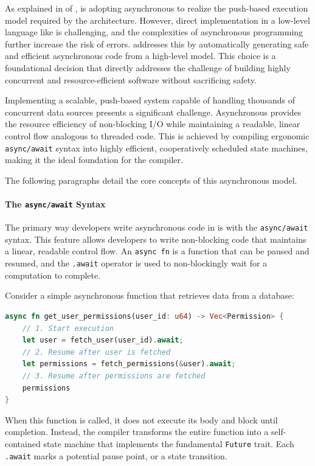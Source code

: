As explained in  of , \ampere is adopting asynchronous \Rust to realize the
push-based execution model required by the \sdv architecture. However, direct implementation in a
low-level language like \Rust is challenging, and the complexities of asynchronous programming
further increase the risk of errors. \GRust addresses this by automatically generating safe and
efficient asynchronous \Rust code from a high-level model. This choice is a foundational decision
that directly addresses the challenge of building highly concurrent and resource-efficient software
without sacrificing safety.

Implementing a scalable, push-based system capable of handling thousands of concurrent data sources
presents a significant challenge. Asynchronous \Rust provides the resource efficiency of
non-blocking I/O while maintaining a readable, linear control flow analogous to threaded code. This
is achieved by compiling ergonomic \texttt{async/await} syntax into highly efficient, cooperatively
scheduled state machines, making it the ideal foundation for the \GRust compiler.

The following paragraphs detail the core concepts of this asynchronous model.

\paragraph{The \texttt{async/await} Syntax}
The primary way developers write asynchronous code in \Rust is with the \texttt{async/await}
syntax. This feature allows developers to write non-blocking code that maintains a linear,
readable control flow. An \texttt{async fn} is a function that can be paused and resumed,
and the \texttt{.await} operator is used to non-blockingly wait for a computation to
complete.

Consider a simple asynchronous function that retrieves data from a database:
\begin{lstlisting}[language=Rust]
async fn get_user_permissions(user_id: u64) -> Vec<Permission> {
    // 1. Start execution
    let user = fetch_user(user_id).await;
    // 2. Resume after user is fetched
    let permissions = fetch_permissions(&user).await;
    // 3. Resume after permissions are fetched
    permissions
}
\end{lstlisting}
When this function is called, it does not execute its body and block until completion.
Instead, the compiler transforms the entire function into a self-contained state machine
that implements the fundamental \texttt{Future} trait. Each \texttt{.await} marks a
potential pause point, or a state transition.

